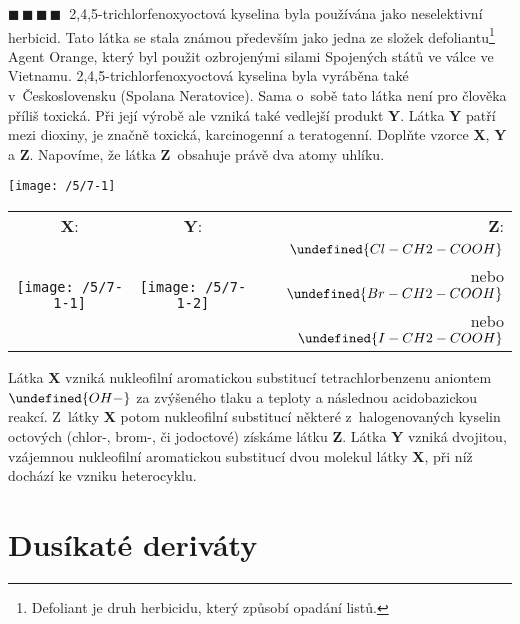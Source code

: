 \documentclass{book}
\let\ch\undefined
\newcommand{\ctyri}{$\blacksquare \, \blacksquare \, \blacksquare \, \blacksquare \; \; $}
\renewenvironment{quotation}{\par}{\par} %
\begin{document}
\hrulefill %
\begin{quotation}
\ctyri 2,4,5-trichlorfenoxyoctová kyselina byla používána jako neselektivní
herbicid. Tato látka se stala známou především jako jedna ze složek
defoliantu\footnote{Defoliant je druh herbicidu, který způsobí opadání listů.} Agent Orange, který byl použit ozbrojenými silami Spojených států
ve válce ve Vietnamu. 2,4,5-trichlorfenoxyoctová kyselina byla vyráběna
také v~Československu (Spolana Neratovice). Sama o~sobě tato látka
není pro člověka příliš toxická. Při její výrobě ale vzniká také
vedlejší produkt \textbf{Y}. Látka \textbf{Y} patří mezi dioxiny, je značně toxická,
karcinogenní a teratogenní. Doplňte vzorce \textbf{X}, \textbf{Y} a \textbf{Z}. Napovíme, že látka \textbf{Z}~obsahuje právě dva atomy uhlíku. 
\begin{center}
\texttt{[image: /5/7-1]} 
\par\end{center}

\end{quotation} \dotfill \par 
\begin{center}
\begin{tabular}{ccr}
\textbf{X}: & \textbf{Y}: & \textbf{Z}:\tabularnewline
\multirow{3}{*}{\texttt{[image: /5/7-1-1]}} & \multirow{3}{*}{\texttt{[image: /5/7-1-2]}} & $\ch{Cl-CH2-COOH}$\tabularnewline
 &  & nebo $\ch{Br-CH2-COOH}$\tabularnewline
 &  & nebo $\ch{I-CH2-COOH}$\tabularnewline
\end{tabular}
\par\end{center}

Látka \textbf{X} vzniká nukleofilní aromatickou substitucí tetrachlorbenzenu aniontem $\ch{OH-}$ za zvýšeného tlaku a teploty a následnou acidobazickou reakcí. Z~látky \textbf{X} potom nukleofilní substitucí některé z~halogenovaných kyselin octových (chlor-, brom-, či jodoctové) získáme látku \textbf{Z}. Látka \textbf{Y} vzniká dvojitou, vzájemnou nukleofilní aromatickou substitucí dvou molekul látky \textbf{X}, při níž dochází ke vzniku heterocyklu.

\newpage %
\section{Dusíkaté deriváty}
\end{document}
